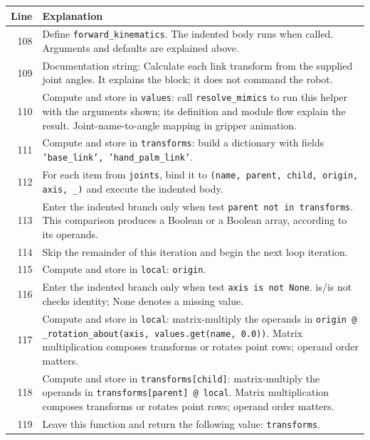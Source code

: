 \documentclass[11pt,a4paper]{book}
\begin{document}
\begin{longtable}{r p{}}

\textbf{Line} & \textbf{Explanation} \\ \hline \endhead

108 & Define \texttt{forward\_kinematics}. The indented body runs when called. Arguments and defaults are explained above. \\

109 & Documentation string: Calculate each link transform from the supplied joint angles. It explains the block; it does not command the robot. \\

110 & Compute and store in \texttt{values}: call \texttt{resolve\_mimics} to run this helper with the arguments shown; its definition and module flow explain the result. Joint-name-to-angle mapping in gripper animation. \\

111 & Compute and store in \texttt{transforms}: build a dictionary with fields \texttt{'base\_link', 'hand\_palm\_link'}.  \\

112 & For each item from \texttt{joints}, bind it to \texttt{(name, parent, child, origin, axis, \_)} and execute the indented body. \\

113 & Enter the indented branch only when test \texttt{parent not in transforms}. This comparison produces a Boolean or a Boolean array, according to its operands. \\

114 & Skip the remainder of this iteration and begin the next loop iteration. \\

115 & Compute and store in \texttt{local}: \texttt{origin}.  \\

116 & Enter the indented branch only when test \texttt{axis is not None}. is/is not checks identity; None denotes a missing value. \\

117 & Compute and store in \texttt{local}: matrix-multiply the operands in \texttt{origin @ \_rotation\_about(axis, values.get(name, 0.0))}. Matrix multiplication composes transforms or rotates point rows; operand order matters.  \\

118 & Compute and store in \texttt{transforms[child]}: matrix-multiply the operands in \texttt{transforms[parent] @ local}. Matrix multiplication composes transforms or rotates point rows; operand order matters.  \\

119 & Leave this function and return the following value: \texttt{transforms}. \\

\end{longtable}
\end{document}
